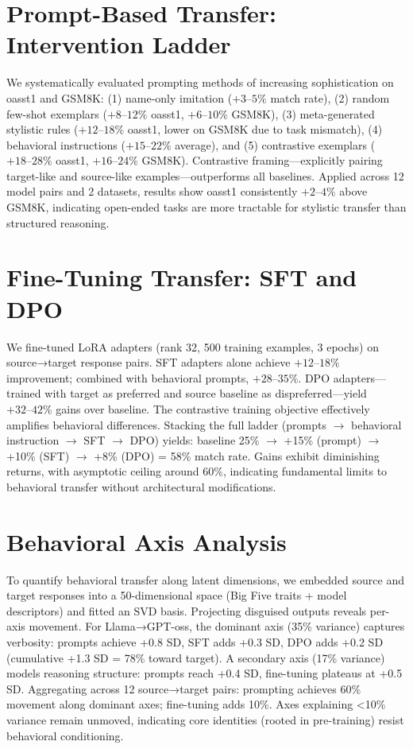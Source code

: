 \documentclass{article}
\begin{document}
\section{Prompt-Based Transfer: Intervention Ladder}
\label{sec:phase_c}

We systematically evaluated prompting methods of increasing sophistication on oasst1 and GSM8K: (1) name-only imitation ($+3\text{--}5\%$ match rate), (2) random few-shot exemplars ($+8\text{--}12\%$ oasst1, $+6\text{--}10\%$ GSM8K), (3) meta-generated stylistic rules ($+12\text{--}18\%$ oasst1, lower on GSM8K due to task mismatch), (4) behavioral instructions ($+15\text{--}22\%$ average), and (5) contrastive exemplars ($+18\text{--}28\%$ oasst1, $+16\text{--}24\%$ GSM8K). Contrastive framing—explicitly pairing target-like and source-like examples—outperforms all baselines. Applied across 12 model pairs and 2 datasets, results show oasst1 consistently $+2\text{--}4\%$ above GSM8K, indicating open-ended tasks are more tractable for stylistic transfer than structured reasoning.

\section{Fine-Tuning Transfer: SFT and DPO}
\label{sec:phase_d}

We fine-tuned LoRA adapters (rank 32, 500 training examples, 3 epochs) on source→target response pairs. SFT adapters alone achieve $+12\text{--}18\%$ improvement; combined with behavioral prompts, $+28\text{--}35\%$. DPO adapters—trained with target as preferred and source baseline as dispreferred—yield $+32\text{--}42\%$ gains over baseline. The contrastive training objective effectively amplifies behavioral differences. Stacking the full ladder (prompts $\rightarrow$ behavioral instruction $\rightarrow$ SFT $\rightarrow$ DPO) yields: baseline 25\% $\rightarrow$ +15\% (prompt) $\rightarrow$ +10\% (SFT) $\rightarrow$ +8\% (DPO) = 58\% match rate. Gains exhibit diminishing returns, with asymptotic ceiling around 60\%, indicating fundamental limits to behavioral transfer without architectural modifications.

\section{Behavioral Axis Analysis}
\label{sec:phase_e}

To quantify behavioral transfer along latent dimensions, we embedded source and target responses into a 50-dimensional space (Big Five traits + model descriptors) and fitted an SVD basis. Projecting disguised outputs reveals per-axis movement. For Llama→GPT-oss, the dominant axis (35\% variance) captures verbosity: prompts achieve +0.8 SD, SFT adds +0.3 SD, DPO adds +0.2 SD (cumulative +1.3 SD = 78\% toward target). A secondary axis (17\% variance) models reasoning structure: prompts reach +0.4 SD, fine-tuning plateaus at +0.5 SD. Aggregating across 12 source→target pairs: prompting achieves 60\% movement along dominant axes; fine-tuning adds 10\%. Axes explaining <10\% variance remain unmoved, indicating core identities (rooted in pre-training) resist behavioral conditioning.
\end{document}
